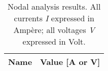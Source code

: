 \begin{table}[h]                             

\centering                                  %
                        
\def\arraystretch{1.2}                       %


\begin{tabular}{c|c}                    %
\hline                                  %

\textbf{Name}  & \textbf{Value [A or V]}\\     

\hline                                %

\hline                                %
\end{tabular}   
\caption{Nodal analysis results. All currents \textit{I} expressed in Ampère; all voltages \textit{V} expressed in Volt.}
\label{tab_3}   
\end{table}                             
\FloatBarrier



